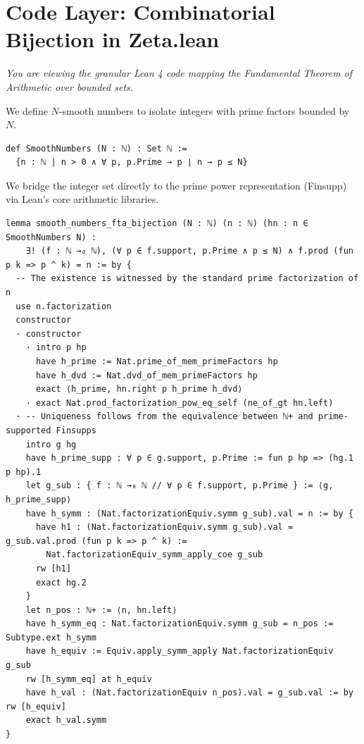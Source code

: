 \documentclass[12pt]{article}
\begin{document}
\newpage
\section*{Code Layer: Combinatorial Bijection in Zeta.lean}
\label{layer3:fta}

\textit{You are viewing the granular Lean 4 code mapping the Fundamental Theorem of Arithmetic over bounded sets.}

We define $N$-smooth numbers to isolate integers with prime factors bounded by $N$.
\begin{lstlisting}
def SmoothNumbers (N : ℕ) : Set ℕ :=
  {n : ℕ | n > 0 ∧ ∀ p, p.Prime → p ∣ n → p ≤ N}
\end{lstlisting}

We bridge the integer set directly to the prime power representation (Finsupp) via Lean's core arithmetic libraries.
\begin{lstlisting}
lemma smooth_numbers_fta_bijection (N : ℕ) (n : ℕ) (hn : n ∈ SmoothNumbers N) :
    ∃! (f : ℕ →₀ ℕ), (∀ p ∈ f.support, p.Prime ∧ p ≤ N) ∧ f.prod (fun p k => p ^ k) = n := by {
  -- The existence is witnessed by the standard prime factorization of n
  use n.factorization
  constructor
  · constructor
    · intro p hp
      have h_prime := Nat.prime_of_mem_primeFactors hp
      have h_dvd := Nat.dvd_of_mem_primeFactors hp
      exact ⟨h_prime, hn.right p h_prime h_dvd⟩
    · exact Nat.prod_factorization_pow_eq_self (ne_of_gt hn.left)
  · -- Uniqueness follows from the equivalence between ℕ+ and prime-supported Finsupps
    intro g hg
    have h_prime_supp : ∀ p ∈ g.support, p.Prime := fun p hp => (hg.1 p hp).1
    let g_sub : { f : ℕ →₀ ℕ // ∀ p ∈ f.support, p.Prime } := ⟨g, h_prime_supp⟩
    have h_symm : (Nat.factorizationEquiv.symm g_sub).val = n := by {
      have h1 : (Nat.factorizationEquiv.symm g_sub).val = g_sub.val.prod (fun p k => p ^ k) := 
        Nat.factorizationEquiv_symm_apply_coe g_sub
      rw [h1]
      exact hg.2
    }
    let n_pos : ℕ+ := ⟨n, hn.left⟩
    have h_symm_eq : Nat.factorizationEquiv.symm g_sub = n_pos := Subtype.ext h_symm
    have h_equiv := Equiv.apply_symm_apply Nat.factorizationEquiv g_sub
    rw [h_symm_eq] at h_equiv
    have h_val : (Nat.factorizationEquiv n_pos).val = g_sub.val := by rw [h_equiv]
    exact h_val.symm
}
\end{lstlisting}
\end{document}
